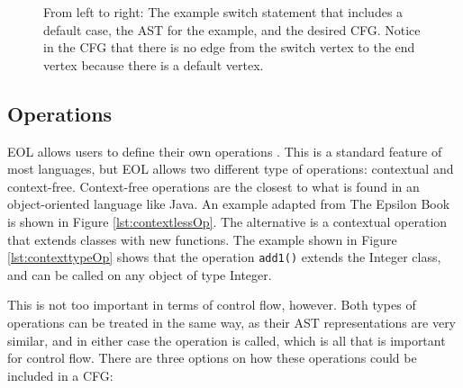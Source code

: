 \begin{figure}
\centering
\begin{minipage}{.4\textwidth}
  \centering
  
\end{minipage}%
\begin{minipage}{.3\textwidth}
  \centering
\end{minipage}
\begin{minipage}{.29\textwidth}
  \centering
\end{minipage}
\caption{From left to right: The example switch statement that includes a default case, the AST for the example, and the desired CFG. Notice in the CFG that there is no edge from the switch vertex to the end vertex because there is a default vertex.}
\label{fig:switch2}
\end{figure}

\subsection{Operations}

EOL allows users to define their own operations \citep{epsilonBook}. This is a standard feature of most languages, but EOL allows two different type of operations: contextual and context-free. Context-free operations are the closest to what is found in an object-oriented language like Java. An example adapted from The Epsilon Book \citep{epsilonBook} is shown in Figure \ref{lst:contextlessOp}. The alternative is a contextual operation that extends classes with new functions. The example shown in Figure \ref{lst:contexttypeOp} shows that the operation \verb|add1()| extends the Integer class, and can be called on any object of type Integer.

This is not too important in terms of control flow, however. Both types of operations can be treated in the same way, as their AST representations are very similar, and in either case the operation is called, which is all that is important for control flow. There are three options on how these operations could be included in a CFG:

